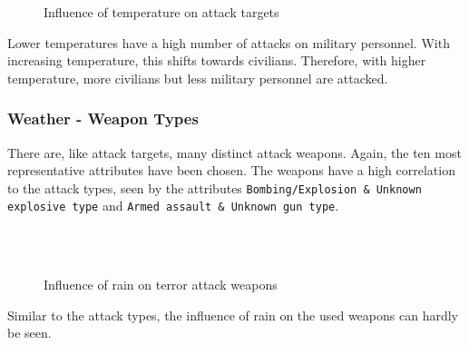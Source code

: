 \newpage

\begin{figure}[!ht]
\centering
    \qquad
    \qquad
    \qquad
    \qquad
    \qquad
\caption{Influence of temperature on attack targets}
\label{fig:example subfigure}
\end{figure}

Lower temperatures have a high number of attacks on military personnel. With increasing temperature, this shifts towards civilians. Therefore, with higher temperature, more civilians but less military personnel are attacked. 

\newpage

\subsubsection{Weather - Weapon Types}
There are, like attack targets, many distinct attack weapons. Again, the ten most representative attributes have been chosen. The weapons have a high correlation to the attack types, seen by the attributes \texttt{Bombing/Explosion \& Unknown explosive type} and \texttt{Armed assault \& Unknown gun type}.

\begin{figure}[!ht]
\centering
    \qquad\\
    \qquad
    \qquad\\
    \qquad
\caption{Influence of rain on terror attack weapons}
\end{figure}

Similar to the attack types, the influence of rain  on the used weapons can hardly be seen.

